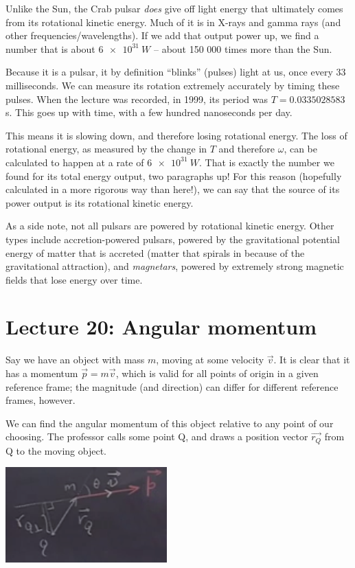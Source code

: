 \documentclass[8.01x]{subfiles}
\begin{document}
Unlike the Sun, the Crab pulsar \emph{does} give off light energy that ultimately comes from its rotational kinetic energy. Much of it is in X-rays and gamma rays (and other frequencies/wavelengths). If we add that output power up, we find a number that is about $\SI{6e31}{W}$ -- about 150 000 times more than the Sun.

Because it is a pulsar, it by definition ``blinks'' (pulses) light at us, once every 33 milliseconds. We can measure its rotation extremely accurately by timing these pulses. When the lecture was recorded, in 1999, its period was $T = 0.0335028583$ s. This goes up with time, with a few hundred nanoseconds per day.

This means it is slowing down, and therefore losing rotational energy. The loss of rotational energy, as measured by the change in $T$ and therefore $\omega$, can be calculated to happen at a rate of $\SI{6e31}{W}$. That is exactly the number we found for its total energy output, two paragraphs up! For this reason (hopefully calculated in a more rigorous way than here!), we can say that the source of its power output is its rotational kinetic energy.

As a side note, not all pulsars are powered by rotational kinetic energy. Other types include accretion-powered pulsars, powered by the gravitational potential energy of matter that is accreted (matter that spirals in because of the gravitational attraction), and \emph{magnetars}, powered by extremely strong magnetic fields that lose energy over time.

\section{Lecture 20: Angular momentum}

Say we have an object with mass $m$, moving at some velocity $\vec{v}$. It is clear that it has a momentum $\vec{p} = m \vec{v}$, which is valid for all points of origin in a given reference frame; the magnitude (and direction) can differ for different reference frames, however.

We can find the angular momentum of this object relative to any point of our choosing. The professor calls some point Q, and draws a position vector $\vec{r_Q}$ from Q to the moving object.

\begin{center}
\includegraphics[scale=0.7]{Graphics/lec20_angular_momentum}
\end{center}
\end{document}

